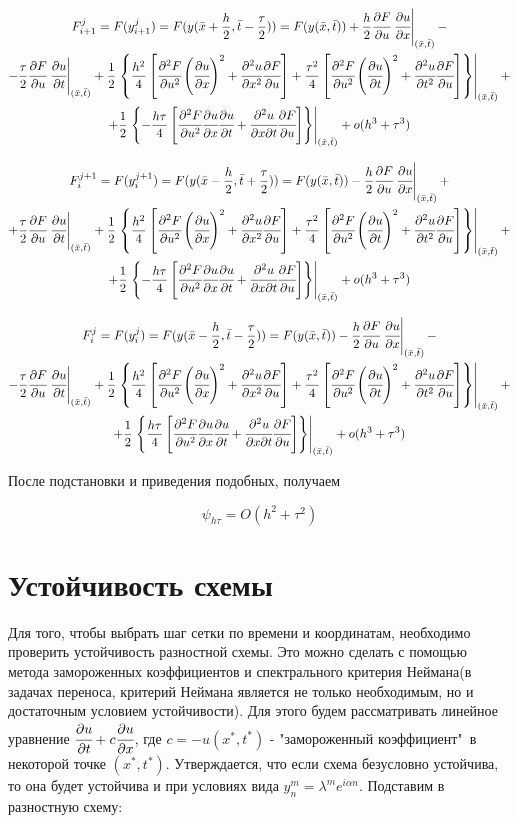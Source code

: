 \documentclass[12pt]{article}
\def\dd#1#2{\cfrac{\partial#1}{\partial#2}}
\def\ddd#1#2#3{\cfrac{\partial^2#1}{\partial#2\partial#3}}
\def\dddd#1#2{\cfrac{\partial^2#1}{\partial{#2}^2}}
\def \atxt#1{\left.#1\right|_{(\bar{x},\bar{t})}}
\begin{document}
		\begin{multline}
			F^{j}_{i+1} = F(y^{j}_{i+1}) = F(y(\bar{x} + \frac{h}{2}, \bar{t} - \frac{\tau}{2})) =  F(y(\bar{x}, \bar{t})) + \frac{h}{2}\dd{F}u\atxt{\dd{u}x} - \\
			-\frac{\tau}{2}\dd{F}u\atxt{\dd{u}t} + \frac{1}{2}\atxt{\left\{ \frac{h^2}{4}\left[ \dddd{F}u \left( \dd{u}x\right)^2 + \dddd{u}x\dd{F}u \right] + \frac{\tau^2}{4}\left[ \dddd{F}u\left( \dd{u}t \right)^2 + \dddd{u}t\dd{F}u \right] \right\}}+\\
			+ \frac{1}{2}\atxt{\left\{ -\frac{h\tau}{4}\left[ \dddd{F}u\dd{u}x\dd{u}t + \ddd{u}{x}t\dd{F}u \right] \right\}} + o(h^3 + \tau^3)
		\end{multline}

		\begin{multline}
			F^{j+1}_{i} = F(y^{j+1}_{i}) = F(y(\bar{x} - \frac{h}{2}, \bar{t} + \frac{\tau}{2})) =  F(y(\bar{x}, \bar{t})) - \frac{h}{2}\dd{F}u\atxt{\dd{u}x} + \\
			+\frac{\tau}{2}\dd{F}u\atxt{\dd{u}t} + \frac{1}{2}\atxt{\left\{ \frac{h^2}{4}\left[ \dddd{F}u \left( \dd{u}x\right)^2 + \dddd{u}x\dd{F}u \right] + \frac{\tau^2}{4}\left[ \dddd{F}u\left( \dd{u}t \right)^2 + \dddd{u}t\dd{F}u \right] \right\}}+\\
			+ \frac{1}{2}\atxt{\left\{ -\frac{h\tau}{4}\left[ \dddd{F}u\dd{u}x\dd{u}t + \ddd{u}{x}t\dd{F}u \right] \right\}} + o(h^3 + \tau^3)
		\end{multline}
		
		\begin{multline}
			F^{j}_{i} = F(y^{j}_{i}) = F(y(\bar{x} - \frac{h}{2}, \bar{t} - \frac{\tau}{2})) =  F(y(\bar{x}, \bar{t})) - \frac{h}{2}\dd{F}u\atxt{\dd{u}x} - \\
			-\frac{\tau}{2}\dd{F}u\atxt{\dd{u}t} + \frac{1}{2}\atxt{\left\{ \frac{h^2}{4}\left[ \dddd{F}u \left( \dd{u}x\right)^2 + \dddd{u}x\dd{F}u \right] + \frac{\tau^2}{4}\left[ \dddd{F}u\left( \dd{u}t \right)^2 + \dddd{u}t\dd{F}u \right] \right\}}+\\
			+ \frac{1}{2}\atxt{\left\{ \frac{h\tau}{4}\left[ \dddd{F}u\dd{u}x\dd{u}t + \ddd{u}{x}t\dd{F}u \right] \right\}} + o(h^3 + \tau^3)
		\end{multline}
		
		После подстановки и приведения подобных, получаем
		
		$$\psi_{h\tau} = O(h^2+\tau^2)$$
		
	\section{Устойчивость схемы}
		Для того, чтобы выбрать шаг сетки по времени и координатам, необходимо проверить устойчивость разностной схемы. Это можно сделать с помощью метода замороженных коэффициентов и спектрального критерия Неймана(в задачах переноса, критерий Неймана является не только необходимым, но и достаточным условием устойчивости). Для этого будем рассматривать линейное уравнение $\dd{u}t + c\dd{u}x$, где $c = -u(x^*,t^*)$ - "замороженный коэффициент"\ в некоторой точке $(x^*,t^*)$. Утверждается, что если схема безусловно устойчива, то она будет устойчива и при условиях вида $y^m_n = \lambda^m e^{i\alpha n}$. Подставим в разностную схему:
		
\end{document}
